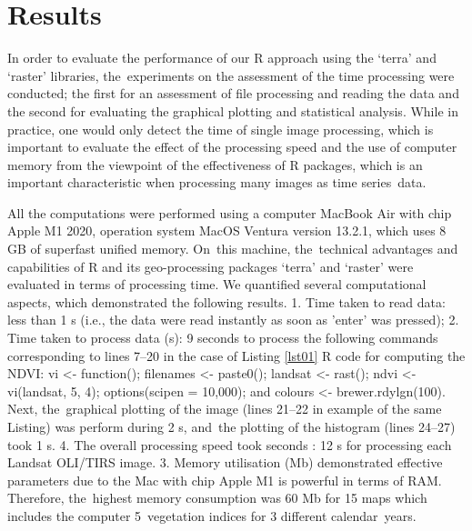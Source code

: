 \documentclass[jimaging,article,accept,pdftex,moreauthors]{Definitions/mdpi}
\begin{document}
\section{Results}\label{sect3}

In order to evaluate the performance of our R approach using the `terra' and `raster' libraries, the~experiments on the assessment of the time processing were conducted; the first for an assessment of file processing and reading the data and the second for evaluating the graphical plotting and statistical analysis. While in practice, one would only detect the time of single image processing, which is important to evaluate the effect of the processing speed and the use of computer memory from the viewpoint of the effectiveness of R packages, which is an important characteristic when processing many images as time series~data.

All the computations were performed using a computer MacBook Air with chip Apple M1 2020, operation system MacOS Ventura version 13.2.1, which uses 8 GB of superfast unified memory. On~this machine, the~technical advantages and capabilities of R and its geo-processing packages `terra' and `raster' were evaluated in terms of processing time. We quantified several computational aspects, which demonstrated the following results. 1. Time taken to read data: less than 1 s (i.e., the data were read instantly as soon as 'enter' was pressed); 2. Time taken to process data (s): 9 seconds to process the following commands corresponding to lines 7--20 in the case of Listing \ref{lst01} R code for computing the NDVI: vi <- function(); filenames <- paste0(); landsat <- rast(); ndvi <- vi(landsat, 5, 4); options(scipen = 10,000); and colours <- brewer.rdylgn(100). Next, the~graphical plotting of the image (lines 21--22 in example of the same Listing) was perform during 2 s, and~the plotting of the histogram (lines 24--27) took 1 s. 4. The overall processing speed took seconds %
: 12 s for processing each Landsat OLI/TIRS image. 3. Memory utilisation (Mb) demonstrated effective parameters due to the Mac with chip Apple M1 %
is powerful in terms of RAM. Therefore, the~highest memory consumption was 60 Mb for 15 maps which includes the computer \mbox{5 vegetation} indices for 3 different calendar~years.
\end{document}
